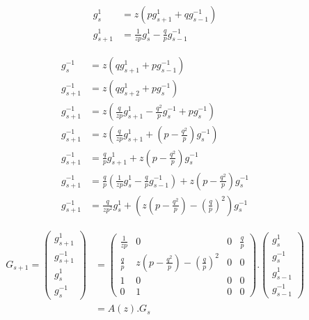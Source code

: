 \documentclass{article}
\newcommand{\g}[2]{g_{#1}^{#2}}
\begin{document}
\begin{align*}
\g{s}{1} &= z ( p  \g{s+1}{1} + q \g{s-1}{-1} ) \\
\g{s+1}{1} &= \frac{1}{z p} \g{s}{1} - \frac{q}{p} \g{s-1}{-1} 
\end{align*}

\begin{align*}
\g{s}{-1} &= z ( q \g{s+1}{1} + p \g{s-1}{-1} ) \\
\g{s+1}{-1} &= z ( q \g{s+2}{1} + p \g{s}{-1} ) \\
\g{s+1}{-1} &= z ( \frac{q}{z p} \g{s+1}{1} - \frac{q^2}{p} \g{s}{-1} + p \g{s}{-1} ) \\
\g{s+1}{-1} &= z ( \frac{q}{z p} \g{s+1}{1} + (p - \frac{q^2}{p}) \g{s}{-1}  ) \\
\g{s+1}{-1} &=  \frac{q}{p} \g{s+1}{1} + z(p - \frac{q^2}{p}) \g{s}{-1}  \\
\g{s+1}{-1} &=  \frac{q}{p} ( \frac{1}{z p} \g{s}{1} - \frac{q}{p} \g{s-1}{-1} ) + z(p - \frac{q^2}{p}) \g{s}{-1}  \\
\g{s+1}{-1} &=  \frac{q}{z p^2} \g{s}{1} + \left( z(p - \frac{q^2}{p}) - ( \frac{q}{p} )^2 \right) \g{s}{-1}  
\end{align*}

\begin{align*}
G_{s+1} = 
\begin{pmatrix} 
\g{s+1}{1} \\ \g{s+1}{-1} \\ \g{s}{1} \\ \g{s}{-1} 
\end{pmatrix}
&= 
\begin{pmatrix} 
\frac{1}{z p} & 0 &  0 &  \frac{q}{p} \\
\frac{q}{p} & z(p - \frac{q^2}{p}) - ( \frac{q}{p} )^2 &  0 & 0\\
1 & 0 &  0 & 0\\
0 & 1 &  0 & 0
\end{pmatrix}
.
\begin{pmatrix} 
\g{s}{1} \\ \g{s}{-1} \\ \g{s-1}{1} \\ \g{s-1}{-1} 
\end{pmatrix} \\
&= 
A(z). G_s
\end{align*}
\end{document}
